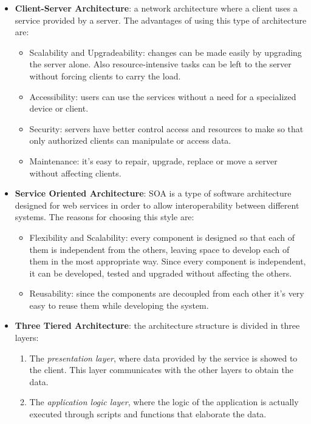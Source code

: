 \documentclass[english]{article}
\begin{document}
\begin{itemize}
  \item{\textbf{Client-Server Architecture}: a network architecture where a client uses a service provided by a server. The advantages of using this type of architecture are:
    \begin{itemize}
      \item{Scalability and Upgradeability: changes can be made easily by upgrading the server alone. Also resource-intensive tasks can be left to the server without forcing clients to carry the load.}
      \item{Accessibility: users can use the services without a need for a specialized device or client.}
      \item{Security: servers have better control access and resources to make so that only authorized clients can manipulate or access data.}
      \item{Maintenance: it’s easy to repair, upgrade, replace or move a server without affecting clients.}
    \end{itemize}
  }
  \item{\textbf{Service Oriented Architecture}: SOA is a type of software architecture designed for web services in order to allow interoperability between different systems. The reasons for choosing this style are:
    \begin{itemize}
      \item{Flexibility and Scalability: every component is designed so that each of them is independent from the others, leaving space to develop each of them in the most appropriate way.
      Since every component is independent, it can be developed, tested and upgraded without affecting the others.}
      \item{Reusability: since the components are decoupled from each other it's very easy to reuse them while developing the system.}
      \end{itemize}
  }
  \item{\textbf{Three Tiered Architecture}: the architecture structure is divided in three layers:
  	\begin{enumerate}
  		\item{The \textit{presentation layer}, where data provided by the service is showed to the client. This layer communicates with the other layers to obtain the data.}
  		\item{The \textit{application logic layer}, where the logic of the application is actually executed through scripts and functions that elaborate the data.}

\end{enumerate}}
\end{itemize}
\end{document}
